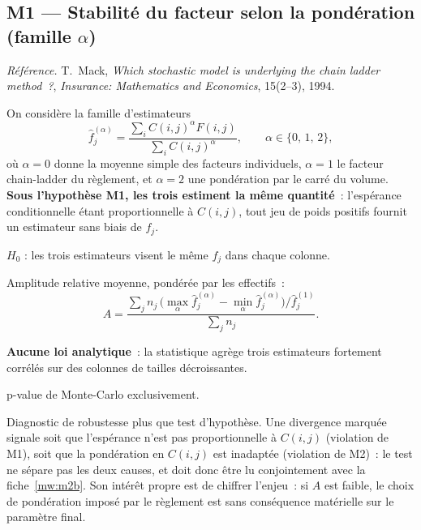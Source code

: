 \documentclass[a4paper,11pt]{article}
\newcommand{\refl}[1]{{\small\textcolor{maincolor!70!black}{\textit{Référence.} #1}}\par\smallskip}
\newcounter{ficheid}
\newenvironment{fiche}[1]{%
  \stepcounter{ficheid}%
  \phantomsection
  \subsection{#1}%
  \label{fiche:\theficheid}%
}{%
  \end{description}\vspace{0.5em}%
}
\newcommand{\Cadre}{%
  \begin{description}[leftmargin=0pt, style=unboxed, itemsep=3pt, topsep=3pt, parsep=2pt]%
  \item[\textcolor{financeblue}{\textbf{1. Cadre, notations et hypothèses de validité (non testées).}}]}
\newcommand{\Hzero}{\item[\textcolor{financeblue}{\textbf{2. Hypothèse nulle.}}]}
\newcommand{\Stat}{\item[\textcolor{financeblue}{\textbf{3. Statistique de test.}}]}
\newcommand{\Loi}{\item[\textcolor{financeblue}{\textbf{4. Loi sous $H_0$.}}]}
\newcommand{\Pval}{\item[\textcolor{financeblue}{\textbf{5. p-value.}}]}
\newcommand{\Usage}{\item[\textcolor{financeblue}{\textbf{6. Usage et limites.}}]}
\begin{document}
\begin{fiche}{M1 --- Stabilité du facteur selon la pondération (famille $\alpha$)}
\label{mw:m1d}
\refl{T.~Mack, \emph{Which stochastic model is underlying the chain ladder
method~?}, \emph{Insurance: Mathematics and Economics}, 15(2--3), 1994.}
\Cadre
On considère la famille d'estimateurs
\[
  \hat f_j^{(\alpha)}
  = \frac{\sum_i C(i,j)^{\alpha} F(i,j)}{\sum_i C(i,j)^{\alpha}},
  \qquad \alpha \in \{0,\,1,\,2\},
\]
où $\alpha = 0$ donne la moyenne simple des facteurs individuels, $\alpha = 1$ le
facteur chain-ladder du règlement, et $\alpha = 2$ une pondération par le carré
du volume. \textbf{Sous l'hypothèse M1, les trois estiment la même quantité}~:
l'espérance conditionnelle étant proportionnelle à $C(i,j)$, tout jeu de poids
positifs fournit un estimateur sans biais de $f_j$.
\Hzero
$H_0$ : les trois estimateurs visent le même $f_j$ dans chaque colonne.
\Stat
Amplitude relative moyenne, pondérée par les effectifs~:
\[
  A = \frac{\sum_j n_j\,
      \big(\max_\alpha \hat f_j^{(\alpha)} - \min_\alpha \hat f_j^{(\alpha)}\big)
      \big/ \hat f_j^{(1)}}{\sum_j n_j}.
\]
\Loi
\textbf{Aucune loi analytique}~: la statistique agrège trois estimateurs
fortement corrélés sur des colonnes de tailles décroissantes.
\Pval
p-value de Monte-Carlo exclusivement.
\Usage
Diagnostic de robustesse plus que test d'hypothèse. Une divergence marquée
signale soit que l'espérance n'est pas proportionnelle à $C(i,j)$ (violation de
M1), soit que la pondération en $C(i,j)$ est inadaptée (violation de M2)~: le
test ne sépare pas les deux causes, et doit donc être lu conjointement avec la
fiche~\ref{mw:m2b}. Son intérêt propre est de chiffrer l'enjeu~: si $A$ est
faible, le choix de pondération imposé par le règlement est sans conséquence
matérielle sur le paramètre final.
\end{fiche}
\end{document}
